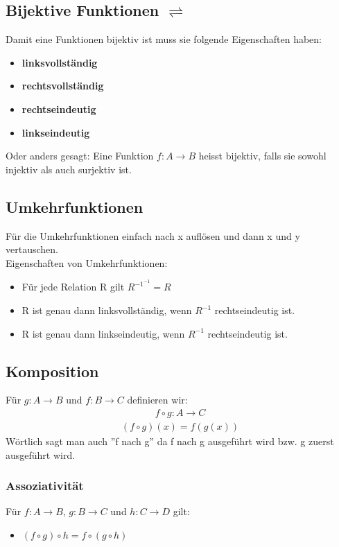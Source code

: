\subsection{Bijektive Funktionen $\rightleftharpoons$}
Damit eine Funktionen bijektiv ist muss sie folgende Eigenschaften haben:
\begin{itemize}
    \item \textbf{linksvollständig}
    \item \textbf{rechtsvollständig}
    \item \textbf{rechtseindeutig}
    \item \textbf{linkseindeutig}  
\end{itemize}
Oder anders gesagt: Eine Funktion $f : A \rightarrow B$ heisst bijektiv, 
falls sie sowohl injektiv als auch surjektiv ist.
\subsection{Umkehrfunktionen}
Für die Umkehrfunktionen einfach nach x auflösen und dann x und y vertauschen.\\
Eigenschaften von Umkehrfunktionen:
\begin{itemize}
    \item Für jede Relation R gilt $R^{-1^{-1}} = R$
    \item R ist genau dann linksvollständig, wenn $R^{-1}$ rechtseindeutig ist.
    \item R ist genau dann linkseindeutig, wenn $R^{-1}$ rechtseindeutig ist.
\end{itemize}
\subsection{Komposition}
Für $g: A \rightarrow B $ und $f: B \rightarrow C$ definieren wir:
\begin{align*}
    f \circ g: A \rightarrow C
\end{align*}
\begin{align*}
    (f \circ g)(x) = f(g(x))
\end{align*}
Wörtlich sagt man auch ''f nach g'' da f nach g ausgeführt wird bzw. g zuerst ausgeführt wird.
\subsubsection{Assoziativität}
Für $f: A \rightarrow B$, $g: B \rightarrow C$ und $h: C \rightarrow D$ gilt:
\begin{itemize}
    \item $(f \circ g) \circ h = f \circ (g \circ h)$
\end{itemize}

